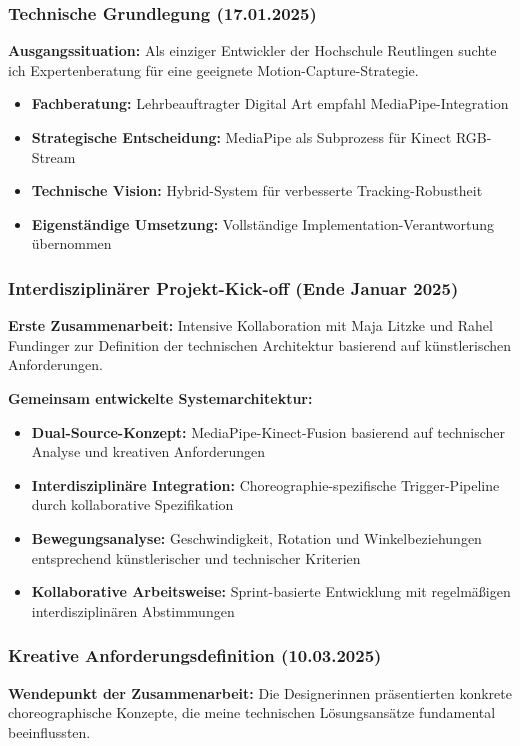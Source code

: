 \subsubsection{Technische Grundlegung (17.01.2025)}
\textbf{Ausgangssituation:} Als einziger Entwickler der Hochschule Reutlingen suchte ich Expertenberatung für eine geeignete Motion-Capture-Strategie.
\begin{itemize}
    \item \textbf{Fachberatung:} Lehrbeauftragter Digital Art empfahl MediaPipe-Integration
    \item \textbf{Strategische Entscheidung:} MediaPipe als Subprozess für Kinect RGB-Stream
    \item \textbf{Technische Vision:} Hybrid-System für verbesserte Tracking-Robustheit
    \item \textbf{Eigenständige Umsetzung:} Vollständige Implementation-Verantwortung übernommen
\end{itemize}

\subsubsection{Interdisziplinärer Projekt-Kick-off (Ende Januar 2025)}
\textbf{Erste Zusammenarbeit:} Intensive Kollaboration mit Maja Litzke und Rahel Fundinger zur Definition der technischen Architektur basierend auf künstlerischen Anforderungen.

\textbf{Gemeinsam entwickelte Systemarchitektur:}
\begin{itemize}
    \item \textbf{Dual-Source-Konzept:} MediaPipe-Kinect-Fusion basierend auf technischer Analyse und kreativen Anforderungen
    \item \textbf{Interdisziplinäre Integration:} Choreographie-spezifische Trigger-Pipeline durch kollaborative Spezifikation
    \item \textbf{Bewegungsanalyse:} Geschwindigkeit, Rotation und Winkelbeziehungen entsprechend künstlerischer und technischer Kriterien
    \item \textbf{Kollaborative Arbeitsweise:} Sprint-basierte Entwicklung mit regelmäßigen interdisziplinären Abstimmungen
\end{itemize}

\subsubsection{Kreative Anforderungsdefinition (10.03.2025)}
\textbf{Wendepunkt der Zusammenarbeit:} Die Designerinnen präsentierten konkrete choreographische Konzepte, die meine technischen Lösungsansätze fundamental beeinflussten.

